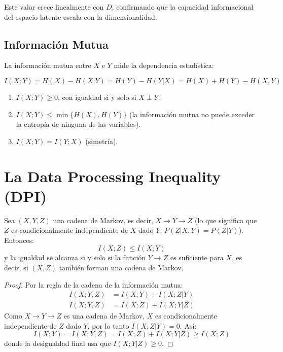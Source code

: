 Este valor crece linealmente con $D$, confirmando que la capacidad informacional
del espacio latente escala con la dimensionalidad.

\subsection{Información Mutua}

La información mutua entre $X$ e $Y$ mide la dependencia estadística:

\begin{equation}
I(X; Y) = H(X) - H(X|Y) = H(Y) - H(Y|X) = H(X) + H(Y) - H(X,Y)

\end{equation}

\begin{theorem}

\begin{enumerate}
\item $I(X; Y) \ge 0$, con igualdad si y solo si $X \perp Y$.
\item $I(X; Y) \le \min\{H(X), H(Y)\}$ (la información mutua no puede exceder
la entropía de ninguna de las variables).
\item $I(X; Y) = I(Y; X)$ (simetría).
\end{enumerate}
\end{theorem}

\section{La Data Processing Inequality (DPI)}

\begin{theorem}

Sea $(X, Y, Z)$ una cadena de Markov, es decir, $X \to Y \to Z$
(lo que significa que $Z$ es condicionalmente independiente de $X$ dado $Y$:
$P(Z|X,Y) = P(Z|Y)$). Entonces:
\begin{equation}
I(X; Z) \le I(X; Y)

\end{equation}
y la igualdad se alcanza si y solo si la función $Y \to Z$ es suficiente
para $X$, es decir, si $(X, Z)$ también forman una cadena de Markov.
\end{theorem}

\begin{proof}
Por la regla de la cadena de la información mutua:
\begin{align}
I(X; Y, Z) &= I(X; Y) + I(X; Z | Y) \\
I(X; Y, Z) &= I(X; Z) + I(X; Y | Z)
\end{align}
Como $X \to Y \to Z$ es una cadena de Markov, $X$ es condicionalmente independiente
de $Z$ dado $Y$, por lo tanto $I(X; Z | Y) = 0$. Así:
\begin{equation}
I(X; Y) = I(X; Y, Z) = I(X; Z) + I(X; Y | Z) \ge I(X; Z)
\end{equation}
donde la desigualdad final usa que $I(X; Y | Z) \ge 0$.
\end{proof}

